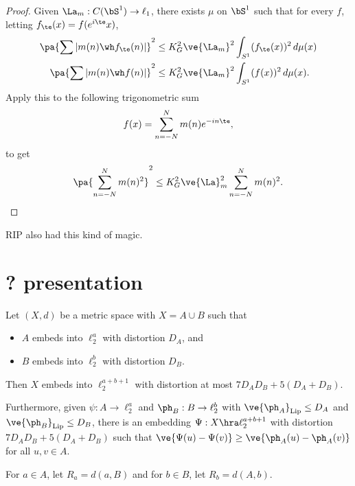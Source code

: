 
\begin{proof}
Given $\La_m:C(\bS^1)\to \ell_1$, there exists $\mu$ on $\bS^1$ such that for every $f$, letting $f_\te(x)=f(e^{i\te}x)$,
\begin{align}
\pa{\sum |m(n)\wh f_\te(n)|}^2&\le K_G^2 \ve{\La_m}^2\int_{S^1} (f_\te(x))^2 \,d\mu(x)\\
\pa{\sum |m(n)\wh f(n)|}^2&\le K_G^2 \ve{\La_m}^2\int_{S^1} (f(x))^2 \,d\mu(x).
\end{align}
Apply this to the following trigonometric sum
\[
f(x) = \sum_{n=-N}^N m(n) e^{-in\te},
\]
to get
\[
\pa{\sum_{n=-N}^N m(n)^2}^2 \le K_G^2 \ve{\La}_m^2 \sum_{n=-N}^N m(n)^2.
\]
\end{proof}

RIP also had this kind of magic.

\section{? presentation}


\begin{thm}
Let $(X,d)$ be a metric space with $X=A\cup B$ such that 
\begin{itemize}
\item
$A$ embeds into $\ell_2^a$ with distortion $D_A$, and
\item
$B$ embeds into $\ell_2^b$ with distortion $D_B$.
\end{itemize}
Then $X$ embeds into $\ell_2^{a+b+1}$ with distortion at most $7D_AD_B+5(D_A+D_B)$. %

Furthermore, given $\psi:A\to \ell_2^a$ and $\ph_B:B\to \ell_2^b$ with $\ve{\ph_A}_{\text{Lip}}\le D_A$ and $\ve{\ph_B}_{\text{Lip}}\le D_B$, there is an embedding $\Psi:X\hra \ell_2^{a+b+1}$ with distortion $7D_AD_B + 5(D_A+D_B)$ such that $\ve{\Psi(u) - \Psi(v)}\ge\ve{\ph_A(u)-\ph_A(v)}$ for all $u,v\in A$.
\end{thm}
For $a\in A$, let $R_a = d(a,B)$ and for $b\in B$, let $R_b=d(A,b)$. 

